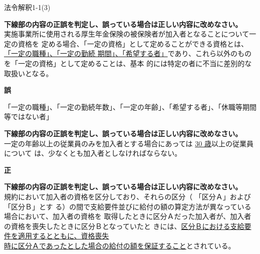 \begin{explanationbox}
  法令解釈1-1(3)
\end{explanationbox}

\begin{truefalse}[年金1 2020 問題1(3)\textcircled{3}]
\textbf{下線部の内容の正誤を判定し、誤っている場合は正しい内容に改めなさい。}
\\

  実施事業所に使用される厚生年金保険の被保険者が加入者となることについて一定の資格を
定める場合、「一定の資格」として定めることができる資格とは、 \underline{「一定の職種」、「一定の勤続
期間」、「希望する者」}であり、これら以外のものを「一定の資格」として定めることは、基本
的には特定の者に不当に差別的な取扱いとなる。
\end{truefalse}

\begin{answerbox}
  \textbf{誤}

  「一定の職種」、「一定の勤続年数」、「一定の年齢」、「希望する者」、「休職等期間等ではない者」
\end{answerbox}

\begin{truefalse}[年金1 2018 問題1(1)\textcircled{2}]
  \textbf{下線部の内容の正誤を判定し、誤っている場合は正しい内容に改めなさい。}
  \\

  一定の年齢以上の従業員のみを加入者とする場合にあっては \underline{30 歳}以上の従業員について
は、少なくとも加入者としなければならない。
\end{truefalse}

\begin{answerbox}
  \textbf{正}
\end{answerbox}

\begin{truefalse}[年金1 2021 問題1(3)\textcircled{2}]
  \textbf{下線部の内容の正誤を判定し、誤っている場合は正しい内容に改めなさい。}
  \\

  規約において加入者の資格を区分しており、それらの区分（ 「区分Ａ」および「区分Ｂ」とす
る）の間で支給要件並びに給付の額の算定方法が異なっている場合において、加入者の資格を
取得したときに区分Ａだった加入者が、加入者の資格を喪失したときに区分Ｂとなっていたと
きには、\underline{区分Ｂにおける支給要件を適用するとともに、資格喪失} \\
\underline{時に区分Ａであったとした場合の給付の額を保証すること}とされている。
\end{truefalse}

